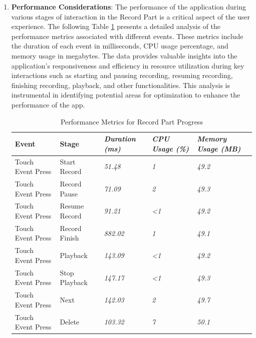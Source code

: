 \documentclass[conference,10pt,letterpaper]{IEEEtran}
\begin{document}
\begin{enumerate}
		\item \textbf{Performance Considerations}: 
		The performance of the application during various stages of interaction in the Record Part is a critical aspect of the user experience. The following Table \ref{tab:performance} presents a detailed analysis of the performance metrics associated with different events. These metrics include the duration of each event in milliseconds, CPU usage percentage, and memory usage in megabytes. The data provides valuable insights into the application's responsiveness and efficiency in resource utilization during key interactions such as starting and pausing recording, resuming recording, finishing recording, playback, and other functionalities. This analysis is instrumental in identifying potential areas for optimization to enhance the performance of the app.
		\begin{table}[!b]
			\centering
			\begin{tabularx}{6.2in}{|X|X|X|X|X|}
				\hline
				\textbf{Event} & \textbf{Stage} & \textbf{\textit{Duration (ms)}} & \textbf{\textit{CPU Usage (\%)}} & \textbf{\textit{Memory Usage (MB)}} \\ \hline
				Touch Event Press & Start Record  & \textit{51.48}  & \textit{1}            & \textit{49.2} \\ \hline
				Touch Event Press & Record Pause  & \textit{71.09}  & \textit{2}            & \textit{49.3} \\ \hline
				Touch Event Press & Resume Record & \textit{91.21}  & \textit{\textless{}1} & \textit{49.2} \\ \hline
				Touch Event Press & Record Finish & \textit{882.02} & \textit{1}            & \textit{49.1} \\ \hline
				Touch Event Press & Playback      & \textit{143.09} & \textit{\textless{}1} & \textit{49.2} \\ \hline
				Touch Event Press & Stop Playback & \textit{147.17} & \textit{\textless{}1} & \textit{49.3} \\ \hline
				Touch Event Press & Next          & \textit{142.03} & \textit{2}            & \textit{49.7} \\ \hline
				Touch Event Press & Delete        & \textit{103.32} & \textit{7}            & \textit{50.1} \\ \hline
			\end{tabularx}
			\caption{Performance Metrics for Record Part Progress}
			\label{tab:performance}
		\end{table}
		
	\end{enumerate}
\end{document}
